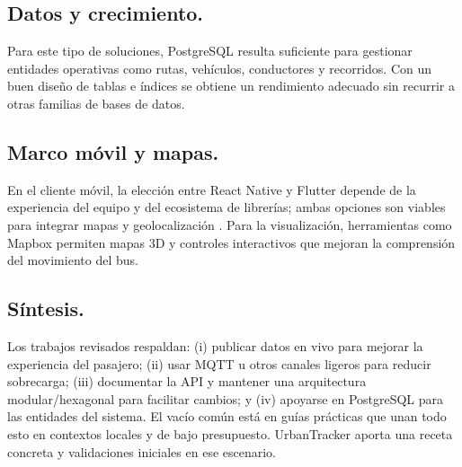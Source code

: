 \subsection{Datos y crecimiento.}
Para este tipo de soluciones, PostgreSQL resulta suficiente para gestionar entidades operativas como rutas, vehículos, conductores y recorridos. Con un buen diseño de tablas e índices se obtiene un rendimiento adecuado sin recurrir a otras familias de bases de datos.

\subsection{Marco móvil y mapas.}
En el cliente móvil, la elección entre React Native y Flutter depende de la experiencia del equipo y del ecosistema de librerías; ambas opciones son viables para integrar mapas y geolocalización \cite{flutter2022new}. Para la visualización, herramientas como Mapbox permiten mapas 3D y controles interactivos que mejoran la comprensión del movimiento del bus.

\subsection{Síntesis.}
Los trabajos revisados respaldan: (i) publicar datos en vivo para mejorar la experiencia del pasajero; (ii) usar MQTT u otros canales ligeros para reducir sobrecarga; (iii) documentar la API y mantener una arquitectura modular/hexagonal para facilitar cambios; y (iv) apoyarse en PostgreSQL para las entidades del sistema. El vacío común está en guías prácticas que unan todo esto en contextos locales y de bajo presupuesto. UrbanTracker aporta una receta concreta y validaciones iniciales en ese escenario.